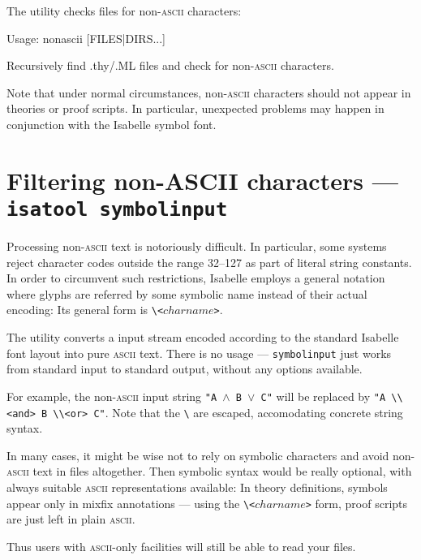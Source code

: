 The  utility checks files for non-\textsc{ascii}
characters:
\begin{ttbox}
Usage: nonascii [FILES|DIRS...]

Recursively find .thy/.ML files and check for non-\textsc{ascii}
characters.
\end{ttbox}
Note that under normal circumstances, non-\textsc{ascii} characters
should not appear in theories or proof scripts.  In particular,
unexpected problems may happen in conjunction with the Isabelle symbol
font.


\section{Filtering non-ASCII characters --- \texttt{isatool symbolinput}}
\label{sec:tool-symbolinput}

Processing non-\textsc{ascii} text is notoriously difficult.  In
particular, some {\ML} systems reject character codes outside the
range 32--127 as part of literal string constants. In order to
circumvent such restrictions, Isabelle employs a general notation
where glyphs are referred by some symbolic name instead of their
actual encoding: Its general form is \verb|\<|$charname$\verb|>|.

The  utility converts a input stream encoded
according to the standard Isabelle font layout into pure
\textsc{ascii} text. There is no usage --- \texttt{symbolinput} just
works from standard input to standard output, without any options
available.

\medskip For example, the non-\textsc{ascii} input string \texttt{"A
  $\land$ B $\lor$ C"} will be replaced by \verb|"A \\<and> B \\<or> C"|.
Note that the \verb|\| are escaped, accomodating concrete {\ML} string
syntax.

\medskip In many cases, it might be wise not to rely on symbolic
characters and avoid non-\textsc{ascii} text in files altogether. Then
symbolic syntax would be really optional, with always suitable
\textsc{ascii} representations available: In theory definitions,
symbols appear only in mixfix annotations --- using the
\verb|\<|$charname$\verb|>| form, proof scripts are just left in plain
\textsc{ascii}.

Thus users with \textsc{ascii}-only facilities will still be able to
read your files.
